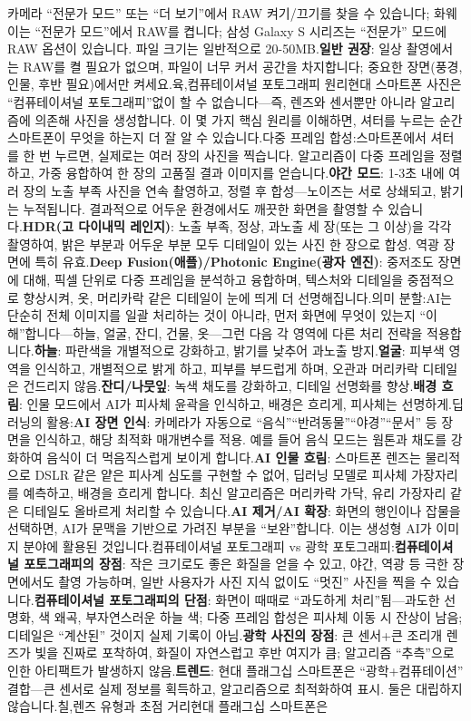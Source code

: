 카메라 “전문가 모드” 또는 “더 보기”에서 RAW 켜기/끄기를 찾을 수 있습니다; 화웨이는 “전문가 모드”에서 RAW를 켭니다; 삼성 Galaxy S 시리즈는 “전문가” 모드에 RAW 옵션이 있습니다. 파일 크기는 일반적으로 20-50MB.\textbf{일반 권장}: 일상 촬영에서는 RAW를 켤 필요가 없으며, 파일이 너무 커서 공간을 차지합니다; 중요한 장면(풍경, 인물, 후반 필요)에서만 켜세요.육,컴퓨테이셔널 포토그래피 원리현대 스마트폰 사진은 “컴퓨테이셔널 포토그래피”없이 할 수 없습니다—즉, 렌즈와 센서뿐만 아니라 알고리즘에 의존해 사진을 생성합니다. 이 몇 가지 핵심 원리를 이해하면, 셔터를 누르는 순간 스마트폰이 무엇을 하는지 더 잘 알 수 있습니다.다중 프레임 합성:스마트폰에서 셔터를 한 번 누르면, 실제로는 여러 장의 사진을 찍습니다. 알고리즘이 다중 프레임을 정렬하고, 가중 융합하여 한 장의 고품질 결과 이미지를 얻습니다.\textbf{야간 모드}: 1-3초 내에 여러 장의 노출 부족 사진을 연속 촬영하고, 정렬 후 합성—노이즈는 서로 상쇄되고, 밝기는 누적됩니다. 결과적으로 어두운 환경에서도 깨끗한 화면을 촬영할 수 있습니다.\textbf{HDR(고 다이내믹 레인지)}: 노출 부족, 정상, 과노출 세 장(또는 그 이상)을 각각 촬영하여, 밝은 부분과 어두운 부분 모두 디테일이 있는 사진 한 장으로 합성. 역광 장면에 특히 유효.\textbf{Deep Fusion(애플)/Photonic Engine(광자 엔진)}: 중저조도 장면에 대해, 픽셀 단위로 다중 프레임을 분석하고 융합하며, 텍스처와 디테일을 중점적으로 향상시켜, 옷, 머리카락 같은 디테일이 눈에 띄게 더 선명해집니다.의미 분할:AI는 단순히 전체 이미지를 일괄 처리하는 것이 아니라, 먼저 화면에 무엇이 있는지 “이해”합니다—하늘, 얼굴, 잔디, 건물, 옷—그런 다음 각 영역에 다른 처리 전략을 적용합니다.\textbf{하늘}: 파란색을 개별적으로 강화하고, 밝기를 낮추어 과노출 방지.\textbf{얼굴}: 피부색 영역을 인식하고, 개별적으로 밝게 하고, 피부를 부드럽게 하며, 오관과 머리카락 디테일은 건드리지 않음.\textbf{잔디/나뭇잎}: 녹색 채도를 강화하고, 디테일 선명화를 향상.\textbf{배경 흐림}: 인물 모드에서 AI가 피사체 윤곽을 인식하고, 배경은 흐리게, 피사체는 선명하게.딥러닝의 활용:\textbf{AI 장면 인식}: 카메라가 자동으로 “음식”“반려동물”“야경”“문서” 등 장면을 인식하고, 해당 최적화 매개변수를 적용. 예를 들어 음식 모드는 웜톤과 채도를 강화하여 음식이 더 먹음직스럽게 보이게 합니다.\textbf{AI 인물 흐림}: 스마트폰 렌즈는 물리적으로 DSLR 같은 얕은 피사계 심도를 구현할 수 없어, 딥러닝 모델로 피사체 가장자리를 예측하고, 배경을 흐리게 합니다. 최신 알고리즘은 머리카락 가닥, 유리 가장자리 같은 디테일도 올바르게 처리할 수 있습니다.\textbf{AI 제거/AI 확장}: 화면의 행인이나 잡물을 선택하면, AI가 문맥을 기반으로 가려진 부분을 “보완”합니다. 이는 생성형 AI가 이미지 분야에 활용된 것입니다.컴퓨테이셔널 포토그래피 vs 광학 포토그래피:\textbf{컴퓨테이셔널 포토그래피의 장점}: 작은 크기로도 좋은 화질을 얻을 수 있고, 야간, 역광 등 극한 장면에서도 촬영 가능하며, 일반 사용자가 사진 지식 없이도 “멋진” 사진을 찍을 수 있습니다.\textbf{컴퓨테이셔널 포토그래피의 단점}: 화면이 때때로 “과도하게 처리”됨—과도한 선명화, 색 왜곡, 부자연스러운 하늘 색; 다중 프레임 합성은 피사체 이동 시 잔상이 남음; 디테일은 “계산된” 것이지 실제 기록이 아님.\textbf{광학 사진의 장점}: 큰 센서+큰 조리개 렌즈가 빛을 진짜로 포착하여, 화질이 자연스럽고 후반 여지가 큼; 알고리즘 “추측”으로 인한 아티팩트가 발생하지 않음.\textbf{트렌드}: 현대 플래그십 스마트폰은 “광학+컴퓨테이션” 결합—큰 센서로 실제 정보를 획득하고, 알고리즘으로 최적화하여 표시. 둘은 대립하지 않습니다.칠,렌즈 유형과 초점 거리현대 플래그십 스마트폰은 